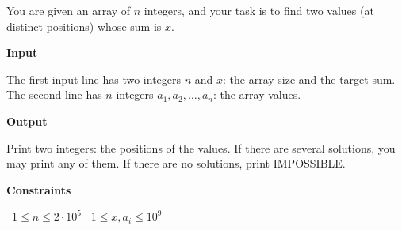 You are given an array of $n$ integers, and your task is to find two values (at distinct positions) whose sum is $x$.

\vspace{0.3cm}\noindent\textbf{Input}

The first input line has two integers $n$ and $x$: the array size and the target sum.
The second line has $n$ integers $a_1,a_2,\dots,a_n$: the array values.

\vspace{0.3cm}\noindent\textbf{Output}

Print two integers: the positions of the values. If there are several solutions, you may print any of them. If there are no solutions, print IMPOSSIBLE.

\vspace{0.3cm}\noindent\textbf{Constraints}

\textbullet\ $1 \le n \le 2 \cdot 10^5$
\textbullet\ $1 \le x,a_i \le 10^9$